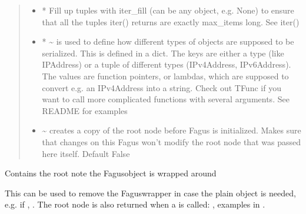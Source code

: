 \documentclass[a4paper,10pt,english]{sphinxmanual}
\begin{document}
\begin{fulllineitems}
\begin{fulllineitems}
\begin{quote}
\begin{description}
\begin{itemize}
\item {}
\sphinxAtStartPar
{} \textendash{} * Fill up tuples with iter\_fill (can be any object, e.g. None) to ensure that all the tuples
iter() returns are exactly max\_items long. See iter()

\item {}
\sphinxAtStartPar
{} \textendash{} * \textasciitilde{} is used to define how different types of objects are supposed to be serialized. This is
defined in a dict. The keys are either a type (like IPAddress) or a tuple of different types
(IPv4Address, IPv6Address). The values are function pointers, or lambdas, which are supposed to convert
e.g. an IPv4Address into a string. Check out TFunc if you want to call more complicated functions with
several arguments. See README for examples

\item {}
\sphinxAtStartPar
{} \textendash{} \textasciitilde{} creates a copy of the root node before Fagus is initialized. Makes sure that changes on this Fagus
won’t modify the root node that was passed here itself. Default False

\end{itemize}

\end{description}\end{quote}

\end{fulllineitems}


\begin{fulllineitems}
\label{\detokenize{fagus.fagus:fagus.fagus.Fagus.root}}
\pysigstartsignatures
{}
\pysigstopsignatures
\sphinxAtStartPar
Contains the root note the Fagus\sphinxhyphen{}object is wrapped around

\sphinxAtStartPar
This can be used to remove the Fagus\sphinxhyphen{}wrapper in case the plain object is needed, e.g. if ,
. The root node is also returned when a is called: , examples in .


\end{fulllineitems}
\end{fulllineitems}
\end{document}
